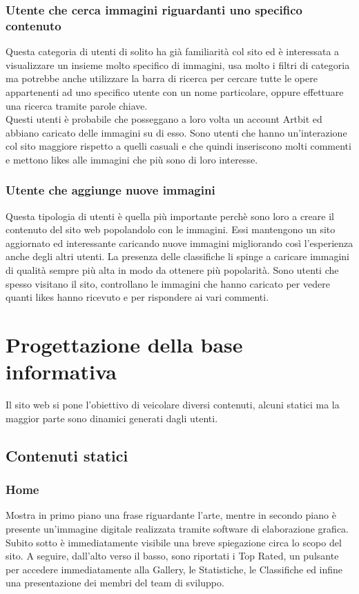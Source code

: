\documentclass[openany, a4paper, 12pt]{report}
\begin{document}
		\subsubsection{Utente che cerca immagini riguardanti uno specifico contenuto}
		Questa categoria di utenti di solito ha già familiarità col sito ed è interessata a visualizzare un insieme molto specifico di immagini, usa molto i filtri di categoria ma potrebbe anche utilizzare la barra di ricerca per cercare tutte le opere appartenenti ad uno specifico utente con un nome particolare, oppure effettuare una ricerca tramite parole chiave.\\
		Questi utenti è probabile che posseggano a loro volta un account Artbit ed abbiano caricato delle immagini su di esso. Sono utenti che hanno un'interazione col sito maggiore rispetto a quelli casuali e che quindi inseriscono molti commenti e mettono likes alle immagini che più sono di loro interesse.\\
		\subsubsection{Utente che aggiunge nuove immagini}
		Questa tipologia di utenti è quella più importante perchè sono loro a creare il contenuto del sito web popolandolo con le immagini. Essi mantengono un sito aggiornato ed interessante caricando nuove immagini migliorando così l'esperienza anche degli altri utenti. La presenza delle classifiche li spinge a caricare immagini di qualità sempre più alta in modo da ottenere più popolarità. Sono utenti che spesso visitano il sito, controllano le immagini che hanno caricato per vedere quanti likes hanno ricevuto e per rispondere ai vari commenti.\\

	\section{Progettazione della base informativa}
		Il sito web si pone l'obiettivo di veicolare diversi contenuti, alcuni statici ma la maggior parte sono dinamici generati dagli utenti.\\
	\subsection{Contenuti statici}
		\subsubsection{Home}
		Mostra in primo piano una frase riguardante l'arte, mentre in secondo piano è presente un'immagine digitale realizzata tramite software di elaborazione grafica. Subito sotto è immediatamente visibile una breve spiegazione circa lo scopo del sito. A seguire, dall'alto verso il basso, sono riportati i Top Rated, un pulsante per accedere immediatamente alla Gallery, le Statistiche, le Classifiche ed infine una presentazione dei membri del team di sviluppo. 
		
\end{document}
